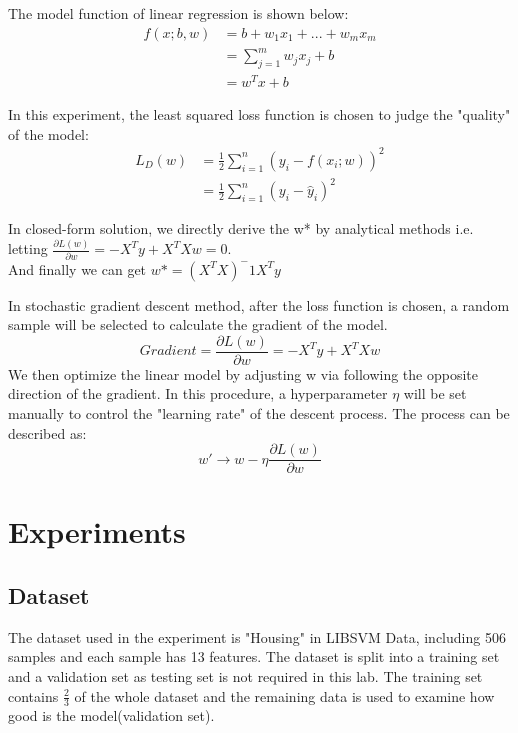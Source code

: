 \documentclass[journal, a4paper]{IEEEtran}
\begin{document}
The model function of linear regression is shown below:
\begin{align*}
f(x;b,w) &= b + w_1x_1 + ... + w_m x_m \\
&= \sum_{j=1}^mw_j x_j + b \\
&= w^Tx + b
\end{align*}

In this experiment, the least squared loss function is chosen to judge the "quality" of the model:
\begin{align*}
L_D(w) &= \frac1 2 \sum_{i=1}^n (y_i - f(x_i;w))^2\\
&= \frac1 2 \sum_{i=1}^n (y_i - \hat y_i)^2
\end{align*}

In closed-form solution, we directly derive the w* by analytical methods i.e. letting $ \frac{\partial L(w)}{\partial w} = -X^Ty + X^TXw = 0$.\\
And finally we can get $ w*=  (X^TX)^-1X^Ty$

In stochastic gradient descent method, after the loss function is chosen, a random sample will be selected to calculate the gradient of the model.
\begin{equation}
Gradient = \frac{\partial L(w)}{\partial w} = -X^Ty + X^TXw
\end{equation} 
We then optimize the linear model by adjusting w via following the opposite direction of the gradient. In this procedure, a hyperparameter $\eta$ will be set manually to control the "learning rate" of the descent process. The process can be described as:
\begin{equation}
w' \rightarrow w - \eta \frac{\partial L(w)}{\partial w}
\end{equation}

\section{Experiments}
\subsection{Dataset}
The dataset used in the experiment is "Housing" in LIBSVM Data, including 506 samples and each sample has 13 features. The dataset is split into a training set and a validation set as testing set is not required in this lab. The training set contains $ \frac23 $ of the whole dataset and the remaining data is used to examine how good is the model(validation set).
\end{document}
